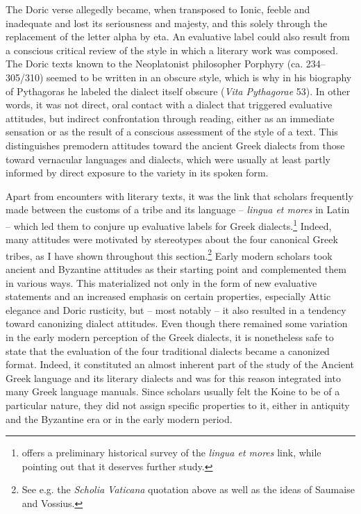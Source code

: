 The Doric verse allegedly became, when transposed to Ionic, feeble and inadequate and lost its seriousness and majesty, and this solely through the replacement of the letter alpha by eta. An evaluative label could also result from a conscious critical review of the style in which a literary work was composed. The Doric texts known to the Neoplatonist philosopher Porphyry (ca. 234–305/310) seemed to be written in an obscure style, which is why in his biography of Pythagoras he labeled the dialect itself obscure (\textit{Vita Pythagorae} 53). In other words, it was not direct, oral contact with a dialect that triggered evaluative attitudes, but indirect confrontation through reading, either as an immediate sensation or as the result of a conscious assessment of the style of a text. This distinguishes premodern attitudes toward the ancient Greek dialects from those toward vernacular languages and dialects, which were usually at least partly informed by direct exposure to the variety in its spoken form.

Apart from encounters with literary texts, it was the link that scholars frequently made between the customs of a tribe and its language – \textit{lingua et mores} in Latin – which led them to conjure up evaluative labels for Greek dialects.\footnote{\citet{VanHal2013} offers a preliminary historical survey of the \textit{lingua et mores} link, while pointing out that it deserves further study.} Indeed, many attitudes were motivated by stereotypes about the four canonical Greek tribes, as I have shown throughout this section.\footnote{See e.g. the \textit{Scholia Vaticana} quotation above as well as the ideas of Saumaise and Vossius.} Early modern scholars took ancient and Byzantine attitudes as their starting point and complemented them in various ways. This materialized not only in the form of new evaluative statements and an increased emphasis on certain properties, especially Attic elegance and Doric rusticity, but – most notably – it also resulted in a tendency toward canonizing dialect attitudes. Even though there remained some variation in the early modern perception of the Greek dialects, it is nonetheless safe to state that the evaluation of the four traditional dialects became a canonized format. Indeed, it constituted an almost inherent part of the study of the Ancient Greek language and its literary dialects and was for this reason integrated into many Greek language manuals. Since scholars usually felt the Koine to be of a particular nature, they did not assign specific properties to it, either in antiquity and the Byzantine era or in the early modern period.

